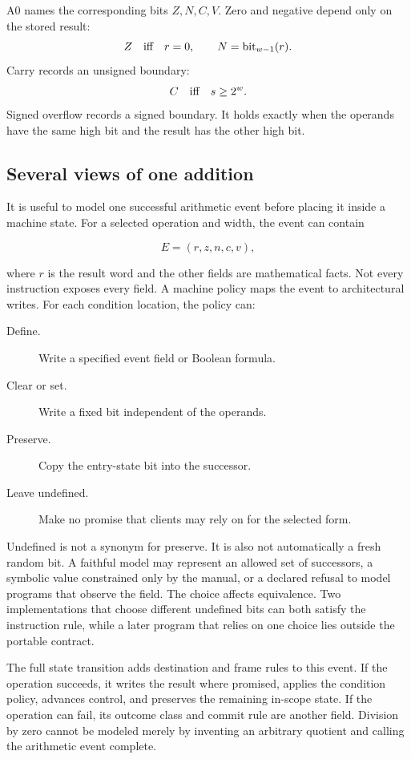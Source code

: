 A0 names the corresponding bits \(Z,N,C,V\). Zero and negative depend only on
the stored result:
\[
 Z\quad\hbox{iff}\quad r=0,
 \qquad
 N=\mathrm{bit}_{w-1}(r).
\]
Carry records an unsigned boundary:
\[
 C\quad\hbox{iff}\quad s\geq 2^w.
\]
Signed overflow records a signed boundary. It holds exactly when the operands
have the same high bit and the result has the other high bit.

\subsection{Several views of one addition}

It is useful to model one successful arithmetic event before placing it inside
a machine state. For a selected operation and width, the event can contain

\[
  E=(r,z,n,c,v),
\]

where \(r\) is the result word and the other fields are mathematical facts.
Not every instruction exposes every field. A machine policy maps the event to
architectural writes. For each condition location, the policy can:

\begin{description}
\item[Define.] Write a specified event field or Boolean formula.
\item[Clear or set.] Write a fixed bit independent of the operands.
\item[Preserve.] Copy the entry-state bit into the successor.
\item[Leave undefined.] Make no promise that clients may rely on for the
selected form.
\end{description}

Undefined is not a synonym for preserve. It is also not automatically a fresh
random bit. A faithful model may represent an allowed set of successors, a
symbolic value constrained only by the manual, or a declared refusal to model
programs that observe the field. The choice affects equivalence. Two
implementations that choose different undefined bits can both satisfy the
instruction rule, while a later program that relies on one choice lies outside
the portable contract.

The full state transition adds destination and frame rules to this event. If
the operation succeeds, it writes the result where promised, applies the
condition policy, advances control, and preserves the remaining in-scope
state. If the operation can fail, its outcome class and commit rule are another
field. Division by zero cannot be modeled merely by inventing an arbitrary
quotient and calling the arithmetic event complete.

